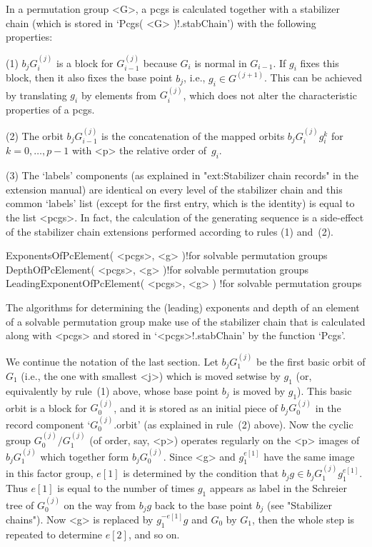 \danger In a permutation group <G>, a pcgs  is calculated together with a
stabilizer chain (which is stored  in `Pcgs( <G> )!.stabChain') with  the
following properties:

(1) $b_jG_i^{(j)}$ is a block for $G_{i-1}^{(j)}$ because $G_i$ is normal
in $G_{i-1}$. If  $g_i$  fixes this block,   then it also fixes the  base
point    $b_j$, i.e.,  $g_i   \in  G^{(j+1)}$.  This can  be  achieved by
translating $g_i$ by elements from $G_i^{(j)}$, which  does not alter the
characteristic properties of a pcgs.

(2)  The  orbit $b_jG_{i-1}^{(j)}$ is   the  concatenation of the  mapped
orbits $b_jG_i^{(j)}g_i^k$ for  $k=0,\ldots,  p-1$ with <p>  the relative
order of~$g_i$.

(3) The `labels'  components   (as  explained in  "ext:Stabilizer   chain
records" in the  extension manual) are  identical on  every level  of the
stabilizer  chain and  this common  `labels'  list (except  for the first
entry, which is the  identity) is equal to the  list <pcgs>. In fact, the
calculation of the generating sequence is a side-effect of the stabilizer
chain extensions performed according to rules (1) and~(2).

\>ExponentsOfPcElement( <pcgs>, <g> )!{for solvable permutation groups}
\>DepthOfPcElement( <pcgs>, <g> )!{for solvable permutation groups}
\>LeadingExponentOfPcElement( <pcgs>, <g> )%
  !{for solvable permutation groups}

The algorithms  for determining the  (leading) exponents and  depth of an
element of a solvable permutation group make use  of the stabilizer chain
that is calculated along with <pcgs> and stored in `<pcgs>!.stabChain' by
the function `Pcgs'.

\danger We continue the notation of the  last section. Let $b_jG_1^{(j)}$
be the first basic orbit of $G_1$ (i.e., the one with smallest <j>) which
is moved setwise by $g_1$ (or, equivalently by rule~(1) above, whose base
point $b_j$ is moved    by $g_1$). This   basic  orbit  is a  block   for
$G_0^{(j)}$, and it  is stored as an  initial piece of  $b_jG_0^{(j)}$ in
the   record component  `$G_0^{(j)}$.orbit'  (as  explained  in  rule~(2)
above). Now  the cyclic group  $G_0^{(j)}/G_1^{(j)}$ (of order, say, <p>)
operates regularly  on the  <p> images  of $b_jG_1^{(j)}$ which  together
form  $b_jG_0^{(j)}$. Since <g> and $g_1^{e[1]}$   have the same image in
this factor group, $e[1]$ is  determined by the  condition that $b_jg \in
b_jG_1^{(j)} g_1^{e[1]}$. Thus $e[1]$  is  equal to  the number  of times
$g_1$ appears as label  in the Schreier   tree of $G_0^{(j)}$ on the  way
from $b_jg$ back  to the base  point $b_j$ (see "Stabilizer chains"). Now
<g> is replaced by $g_1^{-e[1]}g$ and $G_0$ by $G_1$, then the whole step
is repeated to determine $e[2]$, and so on.

